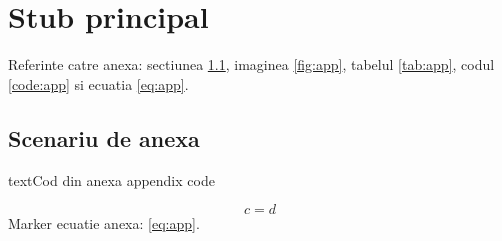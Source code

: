 \documentclass[a4paper,12pt]{report}
\begin{document}
\chapter{Stub principal}
Referinte catre anexa: sectiunea \ref{app:one}, imaginea \ref{fig:app}, tabelul \ref{tab:app}, codul \ref{code:app} si ecuatia \eqref{eq:app}.
\appendixChapter
\section{Scenariu de anexa}\label{app:one}
\begin{code}{text}{Cod din anexa}
appendix code
\end{code}
\begin{equation}
  \label{eq:app}
  c = d
\end{equation}
Marker ecuatie anexa: \eqref{eq:app}.
\end{document}
